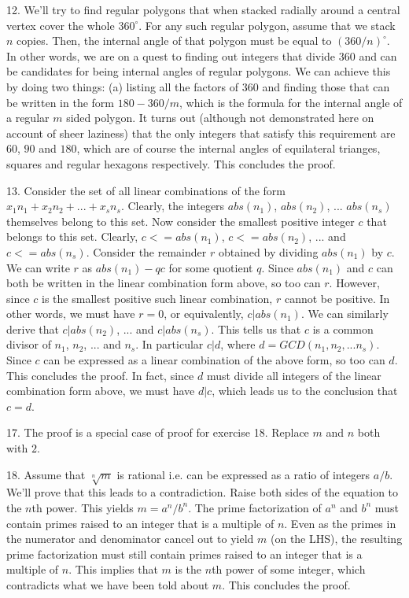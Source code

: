 \documentclass{article}
\begin{document}
12. We'll try to find regular polygons that when stacked radially around a central vertex cover the whole $360^\circ$. For any such regular polygon, assume that we stack $n$ copies. Then, the internal angle of that polygon must be equal to $(360/n)^\circ$. In other words, we are on a quest to finding out integers that divide $360$ and can be candidates for being internal angles of regular polygons. We can achieve this by doing two things: (a) listing all the factors of $360$ and finding those that can be written in the form $180 - 360/m$, which is the formula for the internal angle of a regular $m$ sided polygon. It turns out (although not demonstrated here on account of sheer laziness) that the only integers that satisfy this requirement are $60$, $90$ and $180$, which are of course the internal angles of equilateral trianges, squares and regular hexagons respectively. This concludes the proof.

13. Consider the set of all linear combinations of the form $x_1n_1 + x_2n_2 + ... + x_sn_s$. Clearly, the integers $abs(n_1)$, $abs(n_2)$, ... $abs(n_s)$ themselves belong to this set. Now consider the smallest positive integer $c$ that belongs to this set. Clearly, $c <= abs(n_1)$, $c <= abs(n_2)$, ... and $c <= abs(n_s)$. Consider the remainder $r$ obtained by dividing $abs(n_1)$ by $c$. We can write $r$ as $abs(n_1) - qc$ for some quotient $q$. Since $abs(n_1)$ and $c$ can both be written in the linear combination form above, so too can $r$. However, since $c$ is the smallest positive such linear combination, $r$ cannot be positive. In other words, we must have $r = 0$, or equivalently, $c | abs(n_1)$. We can similarly derive that $c | abs(n_2)$, ... and $c | abs(n_s)$. This tells us that $c$ is a common divisor of $n_1$, $n_2$, ... and $n_s$. In particular $c | d$, where $d = GCD(n_1, n_2, ...n_s)$. Since $c$ can be expressed as a linear combination of the above form, so too can $d$. This concludes the proof. In fact, since $d$ must divide all integers of the linear combination form above, we must have $d | c$, which leads us to the conclusion that $c = d$.

17. The proof is a special case of proof for exercise 18. Replace $m$ and $n$ both with $2$.

18. Assume that $\sqrt[n]{m}$ is rational i.e. can be expressed as a ratio of integers $a / b$. We'll prove that this leads to a contradiction. Raise both sides of the equation to the $n$th power. This yields $m = a^n / b^n$. The prime factorization of $a^n$ and $b^n$ must contain primes raised to an integer that is a multiple of $n$. Even as the primes in the numerator and denominator cancel out to yield $m$ (on the LHS), the resulting prime factorization must still contain primes raised to an integer that is a multiple of $n$. This implies that $m$ is the $n$th power of some integer, which contradicts what we have been told about $m$. This concludes the proof.
\end{document}
